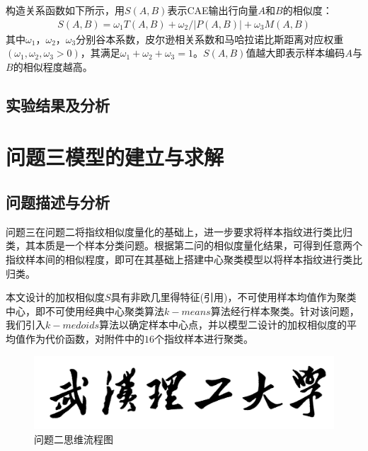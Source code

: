 \documentclass{whutmod}
\begin{document}
			构造关系函数如下所示，用$S(A,B)$表示CAE输出行向量$A$和$B$的相似度：
			\begin{gather}
			S(A,B)=\omega_1 T(A,B)+\omega_2/ |P(A,B)|+\omega_3 M(A,B)
			\end{gather}
			其中$\omega_1$，$\omega_2$，$\omega_3$分别谷本系数，皮尔逊相关系数和马哈拉诺比斯距离对应权重$(\omega_1,\omega_2,\omega_3>0)$，其满足$\omega_1+\omega_2+\omega_3=1$。$S(A,B)$值越大即表示样本编码$A$与$B$的相似程度越高。



        \subsection{实验结果及分析}
        


    \section{问题三模型的建立与求解}

  	\subsection{问题描述与分析}
  	问题三在问题二将指纹相似度量化的基础上，进一步要求将样本指纹进行类比归类，其本质是一个样本分类问题。根据第二问的相似度量化结果，可得到任意两个指纹样本间的相似程度，即可在其基础上搭建中心聚类模型以将样本指纹进行类比归类。
  	
    本文设计的加权相似度$S$具有非欧几里得特征(引用)，不可使用样本均值作为聚类中心，即不可使用经典中心聚类算法$k-means$算法经行样本聚类。针对该问题，我们引入$k-medoids$算法以确定样本中心点，并以模型二设计的加权相似度的平均值作为代价函数，对附件中的$16$个指纹样本进行聚类。
  	
  	\begin{figure}[H]
  		\centering
  		\includegraphics[width=\textwidth]{figures/whut.jpg}
  		\caption{问题二思维流程图}\label{lsssscst}
  	\end{figure}
\end{document}

